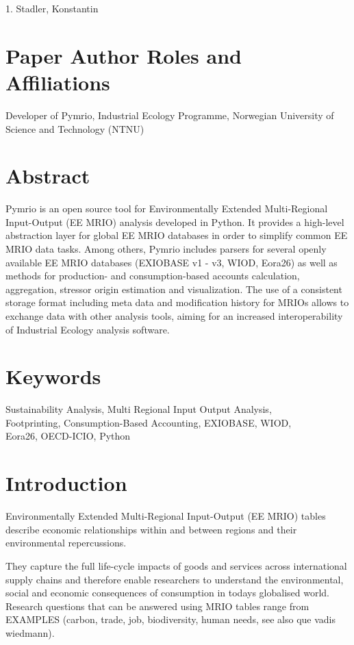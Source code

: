 \documentclass{jors}
\begin{document}
{1. Stadler, Konstantin

\section*{Paper Author Roles and Affiliations}
Developer of Pymrio, Industrial Ecology Programme, Norwegian University of Science and Technology (NTNU)

\section*{Abstract}

Pymrio is an open source tool for Environmentally Extended Multi-Regional Input-Output (EE MRIO) analysis developed in Python.
It provides a high-level abstraction layer for global EE MRIO databases in order to simplify common EE MRIO data tasks. 
Among others, Pymrio includes parsers for several openly available EE MRIO databases (EXIOBASE v1 - v3, WIOD, Eora26) as well as methods for production- and consumption-based accounts calculation, aggregation, stressor origin estimation and visualization. 
The use of a consistent storage format including meta data and modification history for MRIOs allows to exchange data with other analysis tools, aiming for an increased interoperability of Industrial Ecology analysis software.

\section*{Keywords}

Sustainability Analysis, Multi Regional Input Output Analysis, \\ Footprinting, Consumption-Based Accounting, EXIOBASE, WIOD, \\ Eora26, OECD-ICIO, Python

\section*{Introduction}

Environmentally Extended Multi-Regional Input-Output (EE MRIO) tables describe economic relationships within and between regions and their environmental repercussions.

They capture the full life-cycle impacts of goods and services across international supply chains and therefore enable researchers to understand the environmental, social and economic consequences of consumption in todays globalised world. 
Research questions that can be answered using MRIO tables range from 
EXAMPLES (carbon, trade, job, biodiversity, human needs, see also que vadis wiedmann).
 
}
\end{document}
